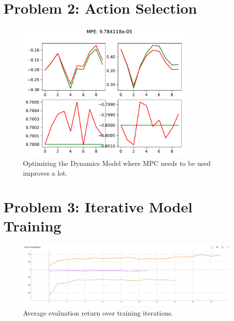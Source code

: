 \documentclass{article}
\begin{document}
\section{Problem 2: Action Selection}
\begin{answer}[title=Plot,height=9.5cm,width=\linewidth]
    \begin{figure}[H]
        \centering
        \includegraphics[height=7cm]{figs/P2.pdf}
        \caption{Optimizing the Dynamics Model where MPC needs to be used improves a lot.}
    \end{figure}
\end{answer}



\section{Problem 3: Iterative Model Training}
\begin{answer}[title=Plot,height=9.5cm,width=\linewidth]
    \begin{figure}[H]
        \centering
        \includegraphics[width=.99\linewidth]{figs/P3_1.png}
        \caption{Average evaluation return over training iterations.
            \color{orange}{Orange: cheetah.}
            \color{violet}{Purple: obstacles.}
            \color{green}{Green: reacher.}}
    \end{figure}
\end{answer}
\end{document}
